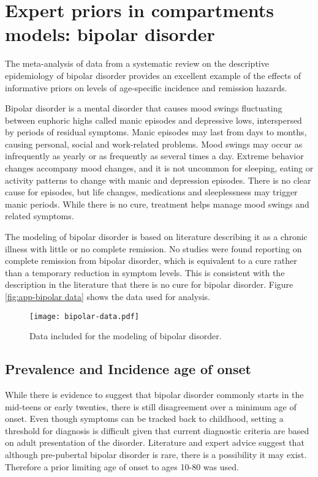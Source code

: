 \chapter{Expert priors in compartments models: bipolar disorder}
\label{applications-prior_level_vals}

The meta-analysis of data from a systematic review on the descriptive
epidemiology of bipolar disorder provides an excellent example of the
effects of informative priors on levels of age-specific incidence and
remission hazards.

Bipolar disorder is a mental disorder that causes mood swings
fluctuating between euphoric highs called manic episodes and
depressive lows, interspersed by periods of residual symptoms.  Manic
episodes may last from days to months, causing personal, social and
work-related problems.  Mood swings may occur as infrequently as
yearly or as frequently as several times a day.  Extreme behavior
changes accompany mood changes, and it is not uncommon for sleeping,
eating or activity patterns to change with manic and depression
episodes.  There is no clear cause for episodes, but life changes,
medications and sleeplessness may trigger manic periods.  While there
is no cure, treatment helps manage mood swings and related
symptoms. \cite{kloos_bipolar_2011, angst_historical_2000}

The modeling of bipolar disorder is based on literature describing it
as a chronic illness with little or no complete remission.  No studies
were found reporting on complete remission from bipolar disorder,
which is equivalent to a cure rather than a temporary reduction in
symptom levels.  This is consistent with the description in the
literature that there is no cure for bipolar
disorder. \cite{association_diagnostic_2000} Figure \ref{fig:app-bipolar
  data} shows the data used for analysis.

    \begin{figure}[h]
        \begin{center}
            \texttt{[image: bipolar-data.pdf]}
            \caption{Data included for the modeling of bipolar
              disorder.}
            \label{fig:app-bipolar data}
        \end{center}
    \end{figure}

\section{Prevalence and Incidence age of onset}
While there is evidence to suggest that bipolar disorder commonly
starts in the mid-teens or early twenties, there is still disagreement
over a minimum age of onset. Even though symptoms can be tracked back
to childhood, setting a threshold for diagnosis is difficult given
that current diagnostic criteria are based on adult presentation of
the disorder. Literature and expert advice suggest that although
pre-pubertal bipolar disorder is rare, there is a possibility it may
exist. \cite{kloos_bipolar_2011, angst_historical_2000} Therefore a
prior limiting age of onset to ages 10-80 was used.

